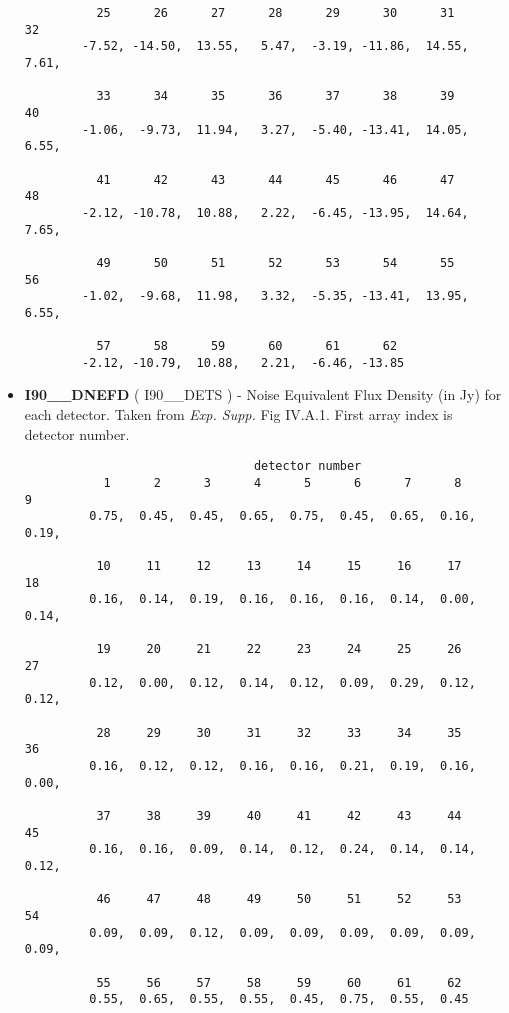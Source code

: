 \begin{itemize}
\begin{minipage}[t]{\textwidth}
\begin{verbatim}
          25      26      27      28      29      30      31      32
        -7.52, -14.50,  13.55,   5.47,  -3.19, -11.86,  14.55,   7.61,

          33      34      35      36      37      38      39      40
        -1.06,  -9.73,  11.94,   3.27,  -5.40, -13.41,  14.05,   6.55,

          41      42      43      44      45      46      47      48
        -2.12, -10.78,  10.88,   2.22,  -6.45, -13.95,  14.64,   7.65,

          49      50      51      52      53      54      55      56
        -1.02,  -9.68,  11.98,   3.32,  -5.35, -13.41,  13.95,   6.55,

          57      58      59      60      61      62
        -2.12, -10.79,  10.88,   2.21,  -6.46, -13.85

\end{verbatim}
\normalsize
\end{minipage}

\item {\bf I90\_\_DNEFD} ( I90\_\_DETS ) -   Noise Equivalent  Flux Density (in Jy)
for each detector. Taken from {\em Exp.  Supp.} Fig IV.A.1. First array index is detector number.

\begin{minipage}[t]{\textwidth}
\small
\begin{verbatim}
                                detector number
           1      2      3      4      5      6      7      8      9
         0.75,  0.45,  0.45,  0.65,  0.75,  0.45,  0.65,  0.16,  0.19,

          10     11     12     13     14     15     16     17     18
         0.16,  0.14,  0.19,  0.16,  0.16,  0.16,  0.14,  0.00,  0.14,

          19     20     21     22     23     24     25     26     27
         0.12,  0.00,  0.12,  0.14,  0.12,  0.09,  0.29,  0.12,  0.12,

          28     29     30     31     32     33     34     35     36
         0.16,  0.12,  0.12,  0.16,  0.16,  0.21,  0.19,  0.16,  0.00,

          37     38     39     40     41     42     43     44     45
         0.16,  0.16,  0.09,  0.14,  0.12,  0.24,  0.14,  0.14,  0.12,

          46     47     48     49     50     51     52     53     54
         0.09,  0.09,  0.12,  0.09,  0.09,  0.09,  0.09,  0.09,  0.09,

          55     56     57     58     59     60     61     62
         0.55,  0.65,  0.55,  0.55,  0.45,  0.75,  0.55,  0.45


\end{verbatim}
\end{minipage}
\end{itemize}
